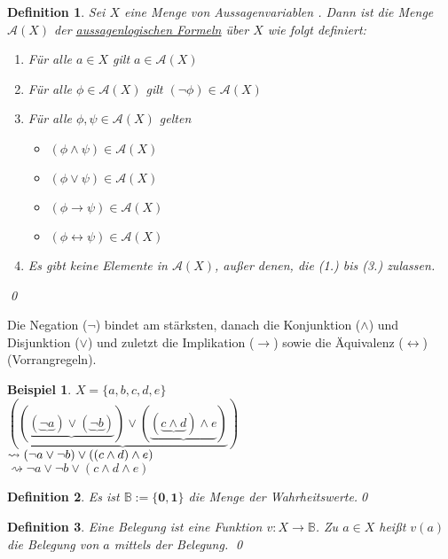 \documentclass[ngerman]{scrartcl}
\theoremstyle{custom}
\newtheorem{mdef}{Definition} \numberwithin{mdef}{subsection}
\newtheorem*{ex}{Beispiel}
\newcommand{\0}{\mathbf{0}}
\newcommand{\1}{\mathbf{L}}
\begin{document}
\begin{mdef} Sei $X$ eine Menge von Aussagenvariablen . Dann ist die
  Menge $\mathcal{A}(X)$ der \underline{aussagenlogischen Formeln}
  \"uber $X$ wie folgt definiert:
\begin{enumerate}
\item F\"ur alle $a \in X$ gilt $a \in \mathcal{A}(X)$
\item F\"ur alle $\phi \in \mathcal{A}(X)$ gilt $(\neg \phi) \in
  \mathcal{A}(X)$
\item F\"ur alle $\phi, \psi \in \mathcal{A}(X)$ gelten
  \begin{itemize}
   \item $(\phi \wedge \psi) \in \mathcal{A}(X)$
   \item $(\phi \vee \psi) \in \mathcal{A}(X)$
   \item $(\phi \rightarrow \psi) \in \mathcal{A}(X)$
   \item $(\phi \leftrightarrow \psi) \in \mathcal{A}(X)$
    \end{itemize}
\item Es gibt keine Elemente in $\mathcal{A}(X)$, au\ss er denen, die
  (1.) bis (3.) zulassen.
\end{enumerate}
\qed
\end{mdef}

Die Negation ($\neg$) bindet am st\"arksten, danach die Konjunktion
($\wedge$) und Disjunktion ($\vee$) und zuletzt die Implikation
($\rightarrow$) sowie die \"Aquivalenz ($\leftrightarrow$) (Vorrangregeln).

\begin{ex}
$X = \{a,b,c,d,e\}$\\
$(\underbrace{(\underbrace{(\underbrace{\neg a}) \vee (\underbrace{\neg b})}) \vee
(\underbrace{(\underbrace{c \wedge d}) \wedge e})})$ \\
$\huge\rightsquigarrow (\neg a \vee \neg b) \vee ((c
\wedge d) \wedge e)$ \\
$\rightsquigarrow \neg a \vee \neg b \vee (c
\wedge d \wedge e)$ \\
\end{ex}

\begin{mdef}Es ist $\mathds{B}:=\{\mathbf{0}, \mathbf{1}\}$ die Menge der
  Wahrheitswerte.\qed 
\end{mdef}
 
\begin{mdef} Eine \emph{Belegung} ist eine Funktion $v: X \rightarrow
  \mathds{B}$. Zu $a \in X$ hei\ss t $v(a)$ die \emph{Belegung} von
  $a$ mittels der Belegung. \qed
\end{mdef}
\end{document}
